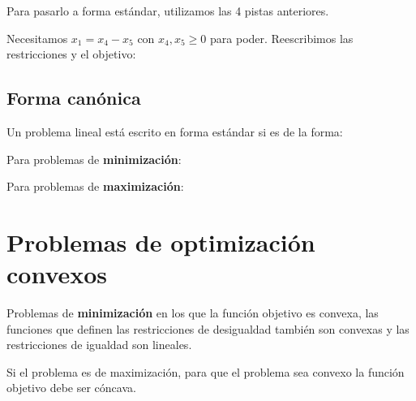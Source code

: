 \begin{example}
\begin{ioprob}
\end{ioprob}

Para pasarlo a forma estándar, utilizamos las 4 pistas anteriores. 

Necesitamos $x_1 = x_4 - x_5$ con $x_4,x_5\geq 0$ para poder. Reescribimos las restricciones y el objetivo:

\begin{ioprob}
\end{ioprob}

\end{example}


\subsection{Forma canónica}

\begin{defn}
Un problema lineal está escrito en forma estándar si es de la forma:


Para problemas de \textbf{minimización}:

\begin{ioprob}
\end{ioprob}


 
Para problemas de \textbf{maximización}:

\begin{ioprob}
\end{ioprob}

\end{defn}


\section{Problemas de optimización convexos}

\begin{defn}
Problemas de \textbf{minimización} en los que la función objetivo es convexa, las funciones que definen las restricciones de desigualdad también son convexas y las restricciones de igualdad son lineales. 

Si el problema es de maximización, para que el problema sea convexo la función objetivo debe ser cóncava.
\end{defn}

